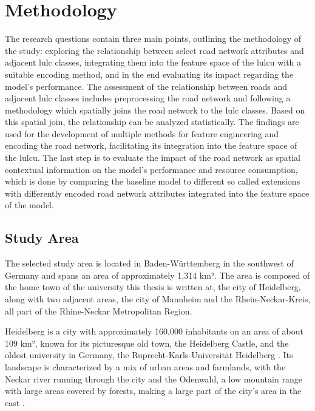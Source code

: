 \chapter{Methodology}
\label{sec:method}

The research questions contain three main points, outlining the methodology of the study: exploring the relationship between select road network attributes and adjacent \gls{lulc} classes, integrating them into the feature space of the \gls{lulcu} with a suitable encoding method, and in the end evaluating its impact regarding the model's performance. The assessment of the relationship between roads and adjacent \gls{lulc} classes includes preprocessing the road network and following a methodology which spatially joins the road network to the \gls{lulc} classes. Based on this spatial join, the relationship can be analyzed statistically. The findings are used for the development of multiple methods for feature engineering and encoding the road network, facilitating its integration into the feature space of the \gls{lulcu}. The last step is to evaluate the impact of the road network as spatial contextual information on the model's performance and resource consumption, which is done by comparing the baseline model to different so called extensions with differently encoded road network attributes integrated into the feature space of the model.

\section{Study Area}

The selected study area is located in Baden-Württemberg in the southwest of Germany and spans an area of approximately 1,314 km². The area is composed of the home town of the university this thesis is written at, the city of Heidelberg, along with two adjacent areas, the city of Mannheim and the Rhein-Neckar-Kreis, all part of the Rhine-Neckar Metropolitan Region.

Heidelberg is a city with approximately 160,000 inhabitants on an area of about 109 km², known for its picturesque old town, the Heidelberg Castle, and the oldest university in Germany, the Ruprecht-Karls-Universität Heidelberg \autocite{Heidelberg2024a}. Its landscape is characterized by a mix of urban areas and farmlands, with the Neckar river running through the city and the Odenwald, a low mountain range with large areas covered by forests, making a large part of the city's area in the east \autocite{Heidelberg2024b}.

